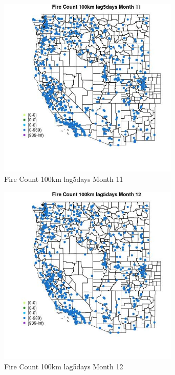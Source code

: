 \begin{figure} 
\centering  
\includegraphics[width=0.77\textwidth]{Code_Outputs/Report_ML_input_PM25_Step4_part_e_de_duplicated_aves_compiled_2019-05-21wNAs_MapObsMo11Fire_Count_100km_lag5days.jpg} 
\caption{\label{fig:Report_ML_input_PM25_Step4_part_e_de_duplicated_aves_compiled_2019-05-21wNAsMapObsMo11Fire_Count_100km_lag5days}Fire Count 100km lag5days Month 11} 
\end{figure} 
 

\begin{figure} 
\centering  
\includegraphics[width=0.77\textwidth]{Code_Outputs/Report_ML_input_PM25_Step4_part_e_de_duplicated_aves_compiled_2019-05-21wNAs_MapObsMo12Fire_Count_100km_lag5days.jpg} 
\caption{\label{fig:Report_ML_input_PM25_Step4_part_e_de_duplicated_aves_compiled_2019-05-21wNAsMapObsMo12Fire_Count_100km_lag5days}Fire Count 100km lag5days Month 12} 
\end{figure} 
 

